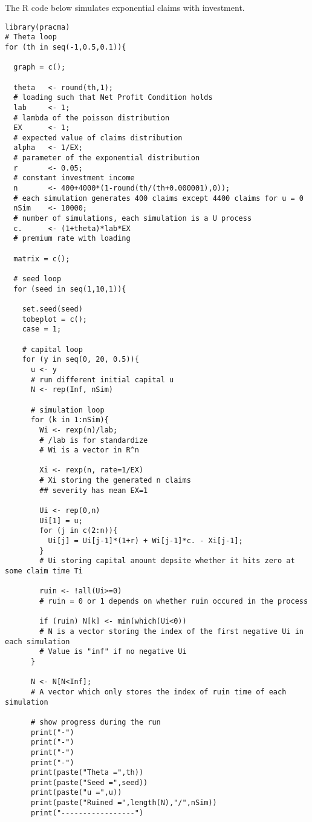 \documentclass[12pt]{article}
\begin{document}
\newpage
The R code below simulates exponential claims with investment.
\begin{lstlisting}
library(pracma)
# Theta loop
for (th in seq(-1,0.5,0.1)){

  graph = c();
  
  theta   <- round(th,1);      
  # loading such that Net Profit Condition holds
  lab     <- 1;                
  # lambda of the poisson distribution
  EX      <- 1;                
  # expected value of claims distribution
  alpha   <- 1/EX;
  # parameter of the exponential distribution
  r       <- 0.05;                
  # constant investment income
  n       <- 400+4000*(1-round(th/(th+0.000001),0));
  # each simulation generates 400 claims except 4400 claims for u = 0
  nSim    <- 10000;
  # number of simulations, each simulation is a U process
  c.      <- (1+theta)*lab*EX  
  # premium rate with loading
  
  matrix = c();
  
  # seed loop
  for (seed in seq(1,10,1)){
    
    set.seed(seed)
    tobeplot = c();
    case = 1;
    
    # capital loop
    for (y in seq(0, 20, 0.5)){
      u <- y
      # run different initial capital u
      N <- rep(Inf, nSim)
      
      # simulation loop
      for (k in 1:nSim){
        Wi <- rexp(n)/lab; 
        # /lab is for standardize
        # Wi is a vector in R^n
        
        Xi <- rexp(n, rate=1/EX)
        # Xi storing the generated n claims
        ## severity has mean EX=1
        
        Ui <- rep(0,n)
        Ui[1] = u;
        for (j in c(2:n)){
          Ui[j] = Ui[j-1]*(1+r) + Wi[j-1]*c. - Xi[j-1];
        }
        # Ui storing capital amount depsite whether it hits zero at some claim time Ti
        
        ruin <- !all(Ui>=0)
        # ruin = 0 or 1 depends on whether ruin occured in the process
        
        if (ruin) N[k] <- min(which(Ui<0))
        # N is a vector storing the index of the first negative Ui in each simulation
        # Value is "inf" if no negative Ui
      }
      
      N <- N[N<Inf]; 
      # A vector which only stores the index of ruin time of each simulation 
      
      # show progress during the run
      print("-")
      print("-")
      print("-")
      print("-")
      print(paste("Theta =",th))
      print(paste("Seed =",seed))
      print(paste("u =",u))
      print(paste("Ruined =",length(N),"/",nSim))
      print("-----------------")
      

\end{lstlisting}
\end{document}
